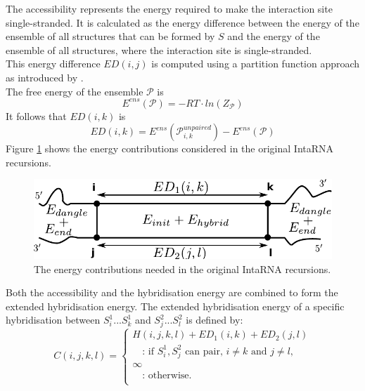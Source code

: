 \documentclass[11pt,a4paper]{report}
\newcommand{\seq}{S} %
\newcommand{\str}{P} %
\newcommand{\ens}{\mathcal{\str}} %
\newcommand{\parr}{Z} %
\begin{document}
The accessibility represents the energy required to make the interaction site single-stranded. It is calculated as the energy difference between the energy of the ensemble of all structures that can be formed by $\seq$ and the energy of the ensemble of all structures, where the interaction site is single-stranded.\\
This energy difference $ED(i,j)$ is computed using a partition function approach as introduced by \citep{McCaskill}.\\
The free energy of the ensemble $\ens$ is\\
\begin{equation*}
E^{ens}(\ens) = -RT \cdot ln(\parr_\ens)
\end{equation*}
It follows that $ED(i,k)$ is\\
\begin{equation*}
ED(i,k) = E^{ens}(\ens_{i,k}^{unpaired}) - E^{ens}(\ens)
\end{equation*}
Figure \ref{contribution} shows the energy contributions considered in the original IntaRNA recursions.
\begin{figure}[H]
\centering
\captionsetup{justification=centering,margin=2cm}
\includegraphics[scale=0.75]{energy.pdf}
\caption{The energy contributions needed in the original IntaRNA recursions.}
\label{contribution}
\end{figure}
\noindent
Both the accessibility and the hybridisation energy are combined to form the extended hybridisation energy.
The extended hybridisation energy of a specific hybridisation between $\seq^1_i ... \seq^1_k$ and $\seq^2_j...\seq^2_l$ is defined by:
\begin{equation*}
C(i,j,k,l) = \begin{cases}
					H(i,j,k,l) + ED_1(i,k) + ED_2(j,l)\\
					\quad\text{: if } \seq_{i}^1, \seq_{j}^2\text{ can pair, }i\neq k \text{ and } j\neq l,\\
   					\infty \\
   					\quad\text{: otherwise.}\\
			\end{cases}
\end{equation*}
\end{document}
